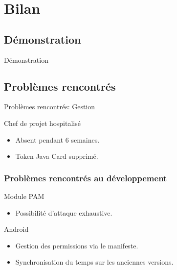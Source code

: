 \documentclass[xcolor=table]{beamer}
\begin{document}
\section{Bilan}

\subsection{Démonstration}
\begin{frame}
\begin{center}
\Huge{Démonstration}
\end{center}
\end{frame}


\subsection{Problèmes rencontrés}
\begin{frame}{Problèmes rencontrés: Gestion}
\begin{block}{Chef de projet hospitalisé}
\begin{itemize}
\item Absent pendant 6 semaines.
\item Token Java Card supprimé.
\end{itemize}
\end{block}

\end{frame}


\begin{frame}
\frametitle{Problèmes rencontrés au développement}
\begin{block}{Module PAM}
\begin{itemize}
\item Possibilité d'attaque exhaustive.
\end{itemize}
\end{block}

\begin{block}{Android}
\begin{itemize}
\item Gestion des permissions via le manifeste.
\item Synchronisation du temps sur les anciennes versions.
\end{itemize}

\end{block}
\end{frame}
\end{document}
